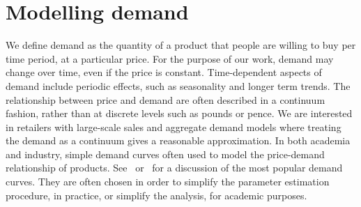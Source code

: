 \documentclass[main.tex]{subfiles}
\begin{document}
\section{Modelling demand}\label{sec:intro_model_demand}
We define demand as the quantity of a product that people are willing
to buy per time period, at a particular price. For the purpose of our
work, demand may change over time, even if the price is constant.
Time-dependent aspects of demand include periodic effects, such as
seasonality and longer term trends.
The relationship between price and demand are often described in a
continuum fashion, rather than at discrete levels such as pounds or
pence. We are interested in retailers with large-scale sales and
aggregate demand models where treating the demand as a continuum gives
a reasonable approximation.
In both academia and industry, simple demand curves often used to
model the price-demand relationship of
products. See~\cite[Ch.~7.3]{talluri2006theory} or~\cite{phillips2005pricing}
for a discussion of the most popular demand curves. They are often
chosen in order to simplify the parameter
estimation procedure, in practice, or simplify the analysis, for academic purposes.
\end{document}
